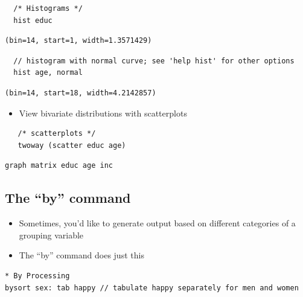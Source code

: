 \documentclass[]{book}
\providecommand{\tightlist}{%
  \setlength{\itemsep}{0pt}\setlength{\parskip}{0pt}}
\begin{document}
\begin{verbatim}
  /* Histograms */
  hist educ
\end{verbatim}

\begin{verbatim}
(bin=14, start=1, width=1.3571429)
\end{verbatim}

\begin{verbatim}
  // histogram with normal curve; see 'help hist' for other options
  hist age, normal  
\end{verbatim}

\begin{verbatim}
(bin=14, start=18, width=4.2142857)
\end{verbatim}

\begin{itemize}
\tightlist
\item
  View bivariate distributions with scatterplots
\end{itemize}

\begin{verbatim}
   /* scatterplots */
   twoway (scatter educ age)
\end{verbatim}

\begin{verbatim}
graph matrix educ age inc
\end{verbatim}

\subsection{\texorpdfstring{The ``by''
command}{The by command}}\label{the-by-command}

\begin{itemize}
\tightlist
\item
  Sometimes, you'd like to generate output based on different categories
  of a grouping variable
\item
  The ``by'' command does just this
\end{itemize}

\begin{verbatim}
* By Processing
bysort sex: tab happy // tabulate happy separately for men and women
\end{verbatim}
\end{document}
